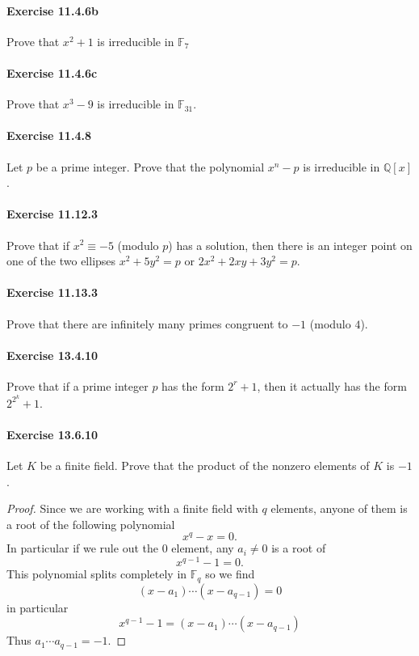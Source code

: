 \documentclass{article}
\begin{document}
\paragraph{Exercise 11.4.6b} Prove that $x^2+1$ is irreducible in $\mathbb{F}_7$


\paragraph{Exercise 11.4.6c} Prove that $x^3 - 9$ is irreducible in $\mathbb{F}_{31}$.


\paragraph{Exercise 11.4.8} Let $p$ be a prime integer. Prove that the polynomial $x^n-p$ is irreducible in $\mathbb{Q}[x]$.


\paragraph{Exercise 11.12.3} Prove that if $x^2 \equiv-5$ (modulo $p$) has a solution, then there is an integer point on one of the two ellipses $x^2+5 y^2=p$ or $2 x^2+2 x y+3 y^2=p$.


\paragraph{Exercise 11.13.3} Prove that there are infinitely many primes congruent to $-1$ (modulo $4$).


\paragraph{Exercise 13.4.10} Prove that if a prime integer $p$ has the form $2^r+1$, then it actually has the form $2^{2^k}+1$.


\paragraph{Exercise 13.6.10} Let $K$ be a finite field. Prove that the product of the nonzero elements of $K$ is $-1$.
\begin{proof}
    Since we are working with a finite field with $q$ elements, anyone of them is a root of the following polynomial
$$
x^q-x=0 .
$$
In particular if we rule out the 0 element, any $a_i \neq 0$ is a root of
$$
x^{q-1}-1=0 .
$$
This polynomial splits completely in $\mathbb{F}_q$ so we find
$$
\left(x-a_1\right) \cdots\left(x-a_{q-1}\right)=0
$$
in particular
$$
x^{q-1}-1=\left(x-a_1\right) \cdots\left(x-a_{q-1}\right)
$$
Thus $a_1 \cdots a_{q-1}=-1$.
\end{proof}
\end{document}

